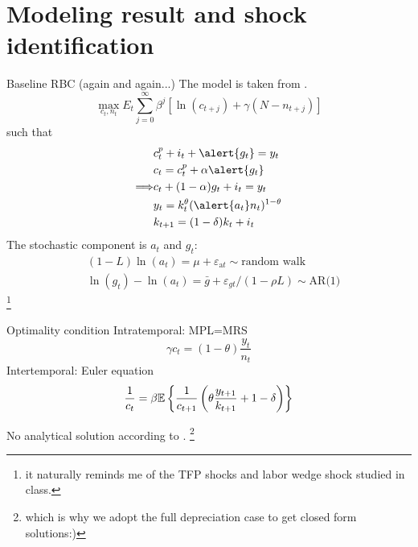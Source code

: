 \documentclass[10pt]{beamer}
\begin{document}
\section{Modeling result and shock identification}

\begin{frame}{Baseline RBC (again and again...)}
	The model is taken from \cite{christiano_eichenbaum_2020}.
	\begin{equation}
		\max_{c_t,n_t} E_{t} \sum_{j=0}^{\infty} \beta^{j} \left[\ln (c_{t+j})+\gamma(N-n_{t+j})\right]
	\end{equation}
	such that 
	\begin{align*}
		  & c_t^p + i_t + \alert{g_t} = y_t                    \\
            & c_t = c_t^p+\alpha \alert{g_t}\\
            \Longrightarrow &c_t + (1-\alpha)g_t +i_t=y_t\\
		  & y_t = k_t^{\theta} (\alert{a_t} n_t)^{1-\theta} \\
		  & k_{t+1} = (1-\delta) k_t + i_t                  \\
	\end{align*}
	The \alert{stochastic} component is $a_t$ and $g_t$:
	\begin{align}
		  & (1-L) \ln \left(a_{t}\right)=\mu+\varepsilon_{\mathrm{a} t}            \sim \text{random walk}        \\
		  & \ln \left(g_{t}\right)-\ln \left(a_{t}\right)=\bar{g}+\varepsilon_{g t} /(1-\rho L) \sim \text{AR(1)} 
	\end{align}\footnote{it naturally reminds me of the TFP shocks and labor wedge shock studied in class.}
\end{frame}
\begin{frame}{Optimality condition}
	Intratemporal: MPL=MRS
	\begin{equation}
		\gamma c_t = (1-\theta)\frac{y_t}{n_t}
	\end{equation}
	Intertemporal: Euler equation
	\begin{equation}
		\frac{1}{c_t}=\beta \mathbb{E}\left\{\frac{1}{c_{t+1}}\left(\theta\frac{y_{t+1}}{k_{t+1}}+1-\delta\right)\right\}
	\end{equation}

\alert{No analytical solution} according to \cite{christiano_eichenbaum_2020}. \footnote{which is why we adopt the full depreciation case to get closed form solutions:)}

\end{frame}
\end{document}
